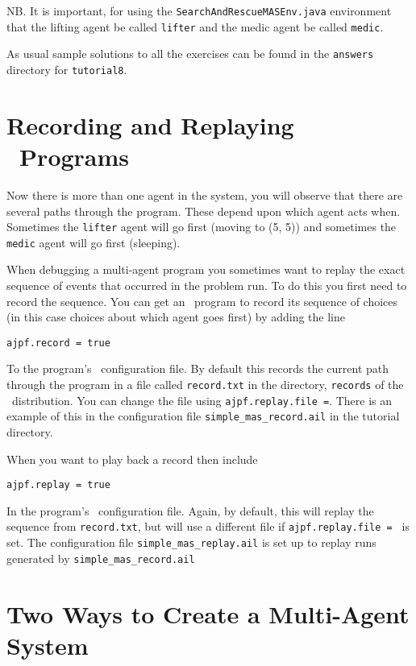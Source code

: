 \documentclass[a4]{article}
\begin{document}
NB. It is important, for using the \texttt{SearchAndRescueMASEnv.java} environment that the lifting agent be called \texttt{lifter} and the medic agent be called \texttt{medic}.

As usual sample solutions to all the exercises can be found in the \texttt{answers} directory for \texttt{tutorial8}.

\section{Recording and Replaying \ail\ Programs}
Now there is more than one agent in the system, you will observe that there are several paths through the program.  These depend upon which agent acts when.  Sometimes the \texttt{lifter} agent will go first (moving to (5, 5)) and sometimes the \texttt{medic} agent will go first (sleeping).

When debugging a multi-agent program you sometimes want to replay the exact sequence of events that occurred in the  problem run.  To do this you first need to record the sequence.  You can get an \ail\ program to record its sequence of choices (in this case choices about which agent goes first) by adding the line

\begin{verbatim}
ajpf.record = true
\end{verbatim}

To the program's \ail\ configuration file.  By default this records the current path through the program in a file called \texttt{record.txt} in the directory, \texttt{records} of the \mcapl\ distribution.  You can change the file using \texttt{ajpf.replay.file =}.  There is an example of this in the configuration file \texttt{simple\_mas\_record.ail} in the tutorial directory.

When you want to play back a record then include 

\begin{verbatim}
ajpf.replay = true
\end{verbatim}

In the program's \ail\ configuration file.  Again, by default, this will replay the sequence from \texttt{record.txt}, but will use a different file if \texttt{ajpf.replay.file = } is set.  The configuration file \texttt{simple\_mas\_replay.ail} is set up to replay runs generated by \texttt{simple\_mas\_record.ail}

\section{Two Ways to Create a Multi-Agent System}
\end{document}
